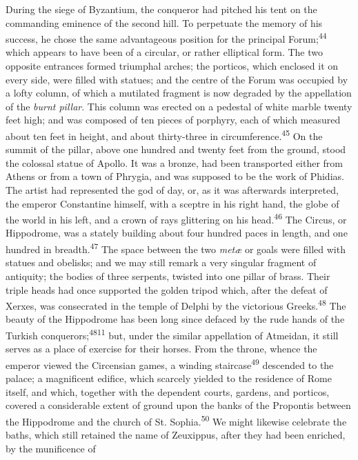 During the siege of Byzantium, the conqueror had pitched his tent
on the commanding eminence of the second hill. To perpetuate the
memory of his success, he chose the same advantageous position
for the principal Forum;\textsuperscript{44} which appears to have been of a
circular, or rather elliptical form. The two opposite entrances
formed triumphal arches; the porticos, which enclosed it on every
side, were filled with statues; and the centre of the Forum was
occupied by a lofty column, of which a mutilated fragment is now
degraded by the appellation of the \textit{burnt pillar}. This column
was erected on a pedestal of white marble twenty feet high; and
was composed of ten pieces of porphyry, each of which measured
about ten feet in height, and about thirty-three in
circumference.\textsuperscript{45} On the summit of the pillar, above one hundred
and twenty feet from the ground, stood the colossal statue of
Apollo. It was a bronze, had been transported either from Athens
or from a town of Phrygia, and was supposed to be the work of
Phidias. The artist had represented the god of day, or, as it was
afterwards interpreted, the emperor Constantine himself, with a
sceptre in his right hand, the globe of the world in his left,
and a crown of rays glittering on his head.\textsuperscript{46} The Circus, or
Hippodrome, was a stately building about four hundred paces in
length, and one hundred in breadth.\textsuperscript{47} The space between the two
\textit{metæ} or goals were filled with statues and obelisks; and we may
still remark a very singular fragment of antiquity; the bodies of
three serpents, twisted into one pillar of brass. Their triple
heads had once supported the golden tripod which, after the
defeat of Xerxes, was consecrated in the temple of Delphi by the
victorious Greeks.\textsuperscript{48} The beauty of the Hippodrome has been long
since defaced by the rude hands of the Turkish conquerors;\textsuperscript{4811}
but, under the similar appellation of Atmeidan, it still serves
as a place of exercise for their horses. From the throne, whence
the emperor viewed the Circensian games, a winding staircase\textsuperscript{49}
descended to the palace; a magnificent edifice, which scarcely
yielded to the residence of Rome itself, and which, together with
the dependent courts, gardens, and porticos, covered a
considerable extent of ground upon the banks of the Propontis
between the Hippodrome and the church of St. Sophia.\textsuperscript{50} We might
likewise celebrate the baths, which still retained the name of
Zeuxippus, after they had been enriched, by the munificence of
